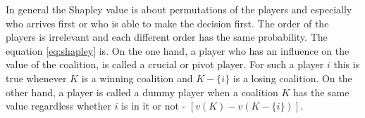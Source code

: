 In general the Shapley value is about permutations of the players and especially who arrives first or who is able to make the decision first. The order of the players is irrelevant and each different order has the same probability. The equation \ref{eq:shapley} is.
On the one hand, a player who has an influence on the value of the coalition, is called a crucial or pivot player. For such a player $i$ this is true whenever $K$ is a winning coalition and $K-\{i\}$ is a losing coalition. On the other hand, a player is called a dummy player when a coalition $K$ has the same value regardless whether $i$ is in it or not - $[v(K) - v(K-\{i\})]$.